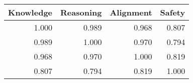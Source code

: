 \begin{tabular}{rrrr}
\toprule
Knowledge & Reasoning & Alignment & Safety \\
\midrule
1.000 & 0.989 & 0.968 & 0.807 \\
0.989 & 1.000 & 0.970 & 0.794 \\
0.968 & 0.970 & 1.000 & 0.819 \\
0.807 & 0.794 & 0.819 & 1.000 \\
\bottomrule
\end{tabular}

